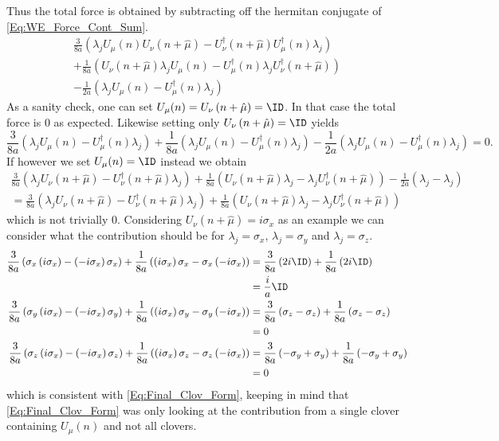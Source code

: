 	Thus the total force is obtained by subtracting off the hermitan conjugate of \cref{Eq:WE_Force_Cont_Sum}.
	\begin{multline}\label{Eq:WE_Total_Force}
		\frac{3}{8a}\left(\lambda_j U_\mu(n)U_\nu\left(n+\hat{\mu}\right)-
		U^\dagger_\nu\left(n+\hat{\mu}\right)U^\dagger_\mu(n)\lambda_j\right)\\
		+\frac{1}{8a}\left( U_\nu\left(n+\hat{\mu}\right)\lambda_j U_\mu(n)-
		U^\dagger_\mu(n)\lambda_j U^\dagger_\nu\left(n+\hat{\mu}\right) \right)\\
		- \frac{1}{2a}\left(\lambda_j U_\mu(n)-U^\dagger_\mu(n)\lambda_j\right)
	\end{multline}
	As a sanity check, one can set $U_\mu(n)=U_\nu\left(n+\hat{\mu}\right)=\ID$. In that case the total force is $0$ as
	expected. Likewise setting only $U_\nu\left(n+\hat{\mu}\right)=\ID$ yields
	\begin{equation}\label{Eq:WE_Total_Force_1}
		\frac{3}{8a}\left(\lambda_j U_\mu(n)-U^\dagger_\mu(n)\lambda_j\right)
		+\frac{1}{8a}\left(\lambda_j U_\mu(n)- U^\dagger_\mu(n)\lambda_j\right)
		- \frac{1}{2a}\left(\lambda_j U_\mu(n)-U^\dagger_\mu(n)\lambda_j\right)=0\text{.}
	\end{equation}
	If however we set $U_\mu(n)=\ID$ instead we obtain
	\begin{multline}\label{Eq:WE_Total_Force_2}
		\frac{3}{8a}\left(\lambda_jU_\nu\left(n+\hat{\mu}\right)-
		U^\dagger_\nu\left(n+\hat{\mu}\right)\lambda_j\right)
		+\frac{1}{8a}\left( U_\nu\left(n+\hat{\mu}\right)\lambda_j-
		\lambda_j U^\dagger_\nu\left(n+\hat{\mu}\right) \right)
		- \frac{1}{2a}\left(\lambda_j -\lambda_j\right)\\=
		\frac{3}{8a}\left(\lambda_jU_\nu\left(n+\hat{\mu}\right)-
		U^\dagger_\nu\left(n+\hat{\mu}\right)\lambda_j\right)
		+\frac{1}{8a}\left( U_\nu\left(n+\hat{\mu}\right)\lambda_j-
		\lambda_j U^\dagger_\nu\left(n+\hat{\mu}\right) \right)
	\end{multline}
	which is not trivially $0$. Considering $U_\nu\left(n+\hat{\mu}\right)=i\sigma_x$ as an example we can consider what
	the contribution should be for $\lambda_j=\sigma_x$, $\lambda_j=\sigma_y$ and $\lambda_j=\sigma_z$. 
	\begin{align}
		\frac{3}{8a}\left(\sigma_x\left(i\sigma_x\right)-\left(-i\sigma_x\right)\sigma_x\right)
		+\frac{1}{8a}\left( \left(i\sigma_x\right)\sigma_x-\sigma_x\left(-i\sigma_x\right)\right)&=
		\frac{3}{8a}\left(2i\ID\right)+\frac{1}{8a}\left(2i\ID\right)\nonumber\\&=\frac{i}{a}\ID\\
		\frac{3}{8a}\left(\sigma_y\left(i\sigma_x\right)-\left(-i\sigma_x\right)\sigma_y\right)
		+\frac{1}{8a}\left(\left(i\sigma_x\right)\sigma_y-\sigma_y\left(-i\sigma_x\right)\right)&=
		\frac{3}{8a}\left(\sigma_z-\sigma_z\right)+\frac{1}{8a}\left(\sigma_z-\sigma_z\right)\nonumber\\&=0\\
		\frac{3}{8a}\left(\sigma_z\left(i\sigma_x\right)-\left(-i\sigma_x\right)\sigma_z\right)
		+\frac{1}{8a}\left(\left(i\sigma_x\right)\sigma_z-\sigma_z\left(-i\sigma_x\right)\right)&=
		\frac{3}{8a}\left(-\sigma_y+\sigma_y\right)+\frac{1}{8a}\left(-\sigma_y+\sigma_y\right)\nonumber\\&=0
	\end{align}
	which is consistent with \cref{Eq:Final_Clov_Form}, keeping in mind that \cref{Eq:Final_Clov_Form} was only looking
	at the contribution from a single clover containing $U_\mu(n)$ and not all clovers.
